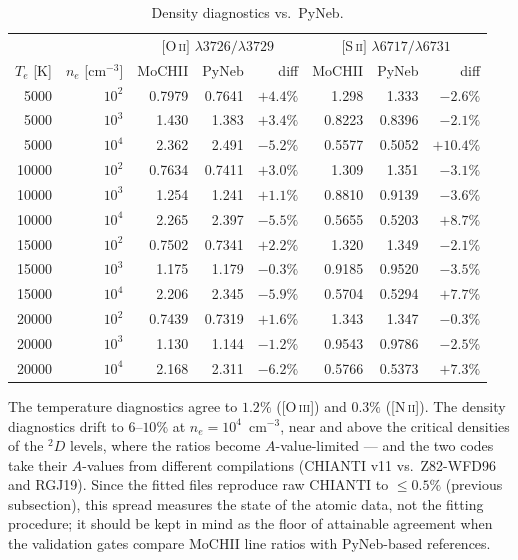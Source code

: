 \documentclass[english,a4paper]{my_memo}
\begin{document}
\begin{table}[p]
\centering
\caption{Density diagnostics vs.\ PyNeb.}
\label{tab:pyneb_ne}
\begin{tabular}{rr rrr rrr}
\hline
 & & \multicolumn{3}{c}{$[$O\,\textsc{ii}$]$ $\lambda3726/\lambda3729$}
   & \multicolumn{3}{c}{$[$S\,\textsc{ii}$]$ $\lambda6717/\lambda6731$} \\
$T_e$ [K] & $n_e$ [cm$^{-3}$] & MoCHII & PyNeb & diff
                              & MoCHII & PyNeb & diff \\
\hline
 5000 & $10^2$ & 0.7979 & 0.7641 & $+4.4\%$ & 1.298  & 1.333  & $-2.6\%$ \\
 5000 & $10^3$ & 1.430  & 1.383  & $+3.4\%$ & 0.8223 & 0.8396 & $-2.1\%$ \\
 5000 & $10^4$ & 2.362  & 2.491  & $-5.2\%$ & 0.5577 & 0.5052 & $+10.4\%$ \\
10000 & $10^2$ & 0.7634 & 0.7411 & $+3.0\%$ & 1.309  & 1.351  & $-3.1\%$ \\
10000 & $10^3$ & 1.254  & 1.241  & $+1.1\%$ & 0.8810 & 0.9139 & $-3.6\%$ \\
10000 & $10^4$ & 2.265  & 2.397  & $-5.5\%$ & 0.5655 & 0.5203 & $+8.7\%$ \\
15000 & $10^2$ & 0.7502 & 0.7341 & $+2.2\%$ & 1.320  & 1.349  & $-2.1\%$ \\
15000 & $10^3$ & 1.175  & 1.179  & $-0.3\%$ & 0.9185 & 0.9520 & $-3.5\%$ \\
15000 & $10^4$ & 2.206  & 2.345  & $-5.9\%$ & 0.5704 & 0.5294 & $+7.7\%$ \\
20000 & $10^2$ & 0.7439 & 0.7319 & $+1.6\%$ & 1.343  & 1.347  & $-0.3\%$ \\
20000 & $10^3$ & 1.130  & 1.144  & $-1.2\%$ & 0.9543 & 0.9786 & $-2.5\%$ \\
20000 & $10^4$ & 2.168  & 2.311  & $-6.2\%$ & 0.5766 & 0.5373 & $+7.3\%$ \\
\hline
\end{tabular}
\end{table}

The temperature diagnostics agree to $1.2\%$ ([O\,\textsc{iii}]) and
$0.3\%$ ([N\,\textsc{ii}]).  The density diagnostics drift to $6$--$10\%$
at $n_e = 10^4$~cm$^{-3}$, near and above the critical densities of the
$^2\!D$ levels, where the ratios become $A$-value-limited --- and the two
codes take their $A$-values from different compilations (CHIANTI v11 vs.\
Z82-WFD96 and RGJ19).  Since the fitted files reproduce raw CHIANTI to
$\leq 0.5\%$ (previous subsection), this spread measures the state of the
atomic data, not the fitting procedure; it should be kept in mind as the floor of
attainable agreement when the validation gates compare MoCHII line ratios
with PyNeb-based references.
\end{document}
